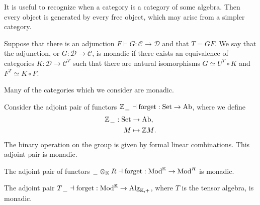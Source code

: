 \documentclass[../thesis.tex]{subfiles}
\begin{document}
        It is useful to recognize when a category is a category of some algebra. Then every object is generated by every free object, which may arise from a simpler category.
        \begin{definition}[Monadicity]
            Suppose that there is an adjunction $F \vdash G: \mathcal{C} \rightarrow \mathcal{D}$ and that $T = GF$. We say that the adjunction, or $G: \mathcal{D} \rightarrow \mathcal{C}$, is monadic if there exists an equivalence of categories $K: \mathcal{D} \rightarrow \mathcal{C}^T$ such that there are natural isomorphisms $G \simeq U^T\circ K$ and $F^T \simeq K \circ F$.
            \begin{center}
            \end{center}
        \end{definition}

        Many of the categories which we consider are monadic.
        \begin{example}
            Consider the adjoint pair of functors $\mathbb{Z}\hspace{0.05cm}\underline{\hspace{0.2cm}}\hspace{0.05cm} \dashv \text{forget}: \text{Set} \rightarrow \text{Ab}$, where we define
            \begin{align*}
                \mathbb{Z}\hspace{0.05cm}\underline{\hspace{0.2cm}}\hspace{0.05cm} : \text{Set} & \rightarrow \text{Ab}\text{,} \\
                M & \mapsto \mathbb{Z}M\text{.}
            \end{align*} 
            The binary operation on the group is given by formal linear combinations. This adjoint pair is monadic.
        \end{example}

        \begin{example}
            The adjoint pair of functors $\hspace{0.05cm}\underline{\hspace{0.2cm}}\hspace{0.05cm}\otimes_\mathbb{K}R \dashv \text{forget} : \text{Mod}^\mathbb{K} \rightarrow \text{Mod}^R$ is monadic.
        \end{example}

        \begin{example}
            The adjoint pair $T\hspace{0.05cm}\underline{\hspace{0.2cm}}\hspace{0.05cm} \dashv \text{forget} : \text{Mod}^\mathbb{K} \rightarrow \text{Alg}_{\mathbb{K},+}$, where $T$ is the tensor algebra, is monadic.
        \end{example}
\end{document}
